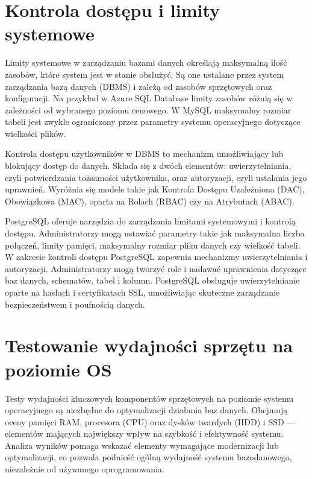 \documentclass[a4paper,11pt,openany,english]{sphinxmanual}
\begin{document}
\section{Kontrola dostępu i limity systemowe}
\label{\detokenize{rozdzial2/index:kontrola-dostepu-i-limity-systemowe}}
\sphinxAtStartPar
Limity systemowe w zarządzaniu bazami danych określają maksymalną ilość zasobów, które system jest w stanie obsłużyć. Są one ustalane przez system zarządzania bazą danych (DBMS) i zależą od zasobów sprzętowych oraz konfiguracji. Na przykład w Azure SQL Database limity zasobów różnią się w zależności od wybranego poziomu cenowego. W MySQL maksymalny rozmiar tabeli jest zwykle ograniczony przez parametry systemu operacyjnego dotyczące wielkości plików.

\sphinxAtStartPar
Kontrola dostępu użytkowników w DBMS to mechanizm umożliwiający lub blokujący dostęp do danych. Składa się z dwóch elementów: uwierzytelniania, czyli potwierdzania tożsamości użytkownika, oraz autoryzacji, czyli ustalania jego uprawnień. Wyróżnia się modele takie jak Kontrola Dostępu Uzależniona (DAC), Obowiązkowa (MAC), oparta na Rolach (RBAC) czy na Atrybutach (ABAC).

\sphinxAtStartPar
PostgreSQL oferuje narzędzia do zarządzania limitami systemowymi i kontrolą dostępu. Administratorzy mogą ustawiać parametry takie jak maksymalna liczba połączeń, limity pamięci, maksymalny rozmiar pliku danych czy wielkość tabeli. W zakresie kontroli dostępu PostgreSQL zapewnia mechanizmy uwierzytelniania i autoryzacji. Administratorzy mogą tworzyć role i nadawać uprawnienia dotyczące baz danych, schematów, tabel i kolumn. PostgreSQL obsługuje uwierzytelnianie oparte na hasłach i certyfikatach SSL, umożliwiając skuteczne zarządzanie bezpieczeństwem i poufnością danych.


\section{Testowanie wydajności sprzętu na poziomie OS}
\label{\detokenize{rozdzial2/index:testowanie-wydajnosci-sprzetu-na-poziomie-os}}
\sphinxAtStartPar
Testy wydajności kluczowych komponentów sprzętowych na poziomie systemu operacyjnego są niezbędne do optymalizacji działania baz danych. Obejmują oceny pamięci RAM, procesora (CPU) oraz dysków twardych (HDD) i SSD — elementów mających największy wpływ na szybkość i efektywność systemu. Analiza wyników pomaga wskazać elementy wymagające modernizacji lub optymalizacji, co pozwala podnieść ogólną wydajność systemu bazodanowego, niezależnie od używanego oprogramowania.
\end{document}
